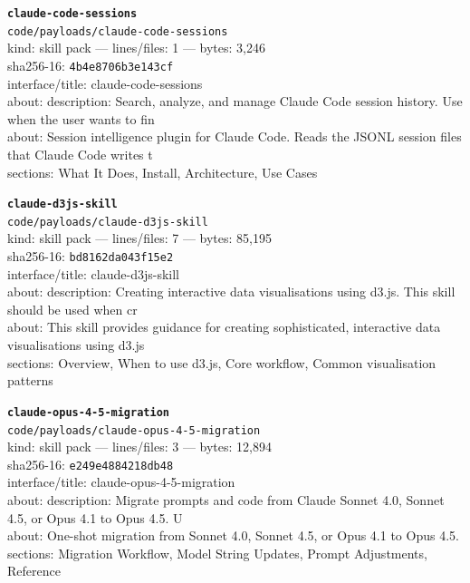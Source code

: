 \noindent\textbf{\texttt{claude-code-sessions}}\\
\texttt{code/payloads/claude-code-sessions}\\
kind: skill pack --- lines/files: 1 --- bytes: 3,246\\
sha256-16: \texttt{4b4e8706b3e143cf}\\
interface/title: claude-code-sessions\\
about: description: Search, analyze, and manage Claude Code session history. Use when the user wants to fin\\
about: Session intelligence plugin for Claude Code. Reads the JSONL session files that Claude Code writes t\\
sections: What It Does, Install, Architecture, Use Cases\\
\vspace*{6.0pt}

\noindent\textbf{\texttt{claude-d3js-skill}}\\
\texttt{code/payloads/claude-d3js-skill}\\
kind: skill pack --- lines/files: 7 --- bytes: 85,195\\
sha256-16: \texttt{bd8162da043f15e2}\\
interface/title: claude-d3js-skill\\
about: description: Creating interactive data visualisations using d3.js. This skill should be used when cr\\
about: This skill provides guidance for creating sophisticated, interactive data visualisations using d3.js\\
sections: Overview, When to use d3.js, Core workflow, Common visualisation patterns\\
\vspace*{6.0pt}
\newpage

\noindent\textbf{\texttt{claude-opus-4-5-migration}}\\
\texttt{code/payloads/claude-opus-4-5-migration}\\
kind: skill pack --- lines/files: 3 --- bytes: 12,894\\
sha256-16: \texttt{e249e4884218db48}\\
interface/title: claude-opus-4-5-migration\\
about: description: Migrate prompts and code from Claude Sonnet 4.0, Sonnet 4.5, or Opus 4.1 to Opus 4.5. U\\
about: One-shot migration from Sonnet 4.0, Sonnet 4.5, or Opus 4.1 to Opus 4.5.\\
sections: Migration Workflow, Model String Updates, Prompt Adjustments, Reference\\
\vspace*{6.0pt}

